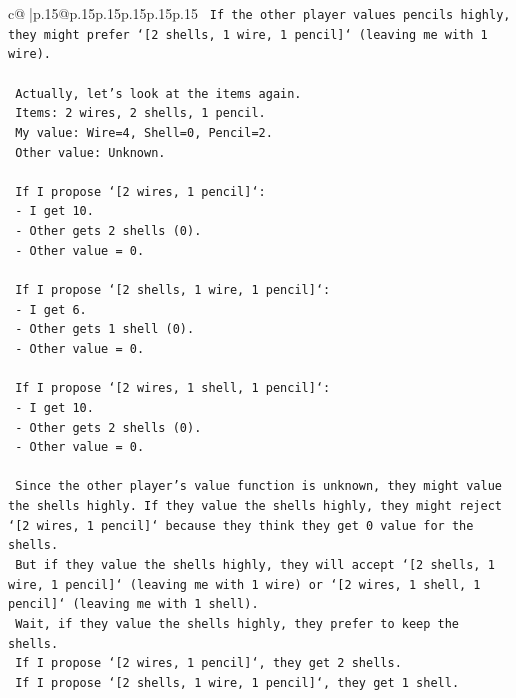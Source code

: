 \documentclass{article}
\begin{document}
{\begin{supertabular}{c@{$\;$}|p{.15\linewidth}@{}p{.15\linewidth}p{.15\linewidth}p{.15\linewidth}p{.15\linewidth}p{.15\linewidth}}
{{{\texttt{    If the other player values pencils highly, they might prefer `{[}2 shells, 1 wire, 1 pencil{]}` (leaving me with 1 wire).} \\
\\ 
\texttt{    Actually, let's look at the items again.} \\
\texttt{    Items: 2 wires, 2 shells, 1 pencil.} \\
\texttt{    My value: Wire=4, Shell=0, Pencil=2.} \\
\texttt{    Other value: Unknown.} \\
\\ 
\texttt{    If I propose `{[}2 wires, 1 pencil{]}`:} \\
\texttt{    {-}   I get 10.} \\
\texttt{    {-}   Other gets 2 shells (0).} \\
\texttt{    {-}   Other value = 0.} \\
\\ 
\texttt{    If I propose `{[}2 shells, 1 wire, 1 pencil{]}`:} \\
\texttt{    {-}   I get 6.} \\
\texttt{    {-}   Other gets 1 shell (0).} \\
\texttt{    {-}   Other value = 0.} \\
\\ 
\texttt{    If I propose `{[}2 wires, 1 shell, 1 pencil{]}`:} \\
\texttt{    {-}   I get 10.} \\
\texttt{    {-}   Other gets 2 shells (0).} \\
\texttt{    {-}   Other value = 0.} \\
\\ 
\texttt{    Since the other player's value function is unknown, they might value the shells highly. If they value the shells highly, they might reject `{[}2 wires, 1 pencil{]}` because they think they get 0 value for the shells.} \\
\texttt{    But if they value the shells highly, they will accept `{[}2 shells, 1 wire, 1 pencil{]}` (leaving me with 1 wire) or `{[}2 wires, 1 shell, 1 pencil{]}` (leaving me with 1 shell).} \\
\texttt{    Wait, if they value the shells highly, they prefer to keep the shells.} \\
\texttt{    If I propose `{[}2 wires, 1 pencil{]}`, they get 2 shells.} \\
\texttt{    If I propose `{[}2 shells, 1 wire, 1 pencil{]}`, they get 1 shell.} \\
}}}
\end{supertabular}}
\end{document}
